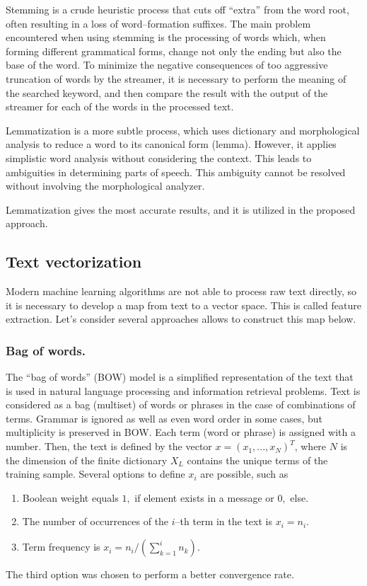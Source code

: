 \documentclass[12pt]{jpconf}
\begin{document}
Stemming is a crude heuristic process that cuts off ``extra'' from the word root, often resulting in a loss of word--formation suffixes. The main problem encountered when using stemming is the processing of words which, when forming different grammatical forms, change not only the ending but also the base of the word. To minimize the negative consequences of too aggressive truncation of words by the streamer, it is necessary to perform the meaning of the searched keyword, and then compare the result with the output of the streamer for each of the words in the processed text. 

Lemmatization is a more subtle process, which uses dictionary and morphological analysis to reduce a word to its canonical form (lemma). However, it applies simplistic word analysis without considering the context. This leads to ambiguities in determining parts of speech. This ambiguity cannot be resolved without involving the morphological analyzer.

Lemmatization gives the most accurate results, and it is utilized in the proposed approach.

\subsection{Text vectorization}
Modern machine learning algorithms are not able to process raw text directly, so it is necessary to develop a map from text to a vector space. This is called feature extraction. 
Let's consider several approaches allows to construct this map below.

\subsubsection*{Bag of words.}
The ``bag of words'' (BOW) model is a simplified representation of the text that is used in natural language processing and information retrieval problems. Text is considered as a bag (multiset) of words or phrases in the case of combinations of terms. Grammar is ignored as well as even word order in some cases, but multiplicity is preserved in BOW. Each term (word or phrase) is assigned with a number. Then, the text is defined by the vector $x=(x_1,..., x_N)^T$, where $N$ is the dimension of the finite dictionary $X_L$ contains the unique terms of the training sample. Several options to define $x_i$ are possible, such as
\begin{enumerate}
\item Boolean weight equals $1,$ if element exists in a message or 
$0,$ else.
\item The number of occurrences of the $i$--th term in the text is 
$x_i = n_i.$
\item Term frequency is $x_i = n_i\slash\left(\sum\limits_{k=1}^i n_k\right).$
\end{enumerate}
The third option was chosen to perform a better convergence rate.
\end{document}
